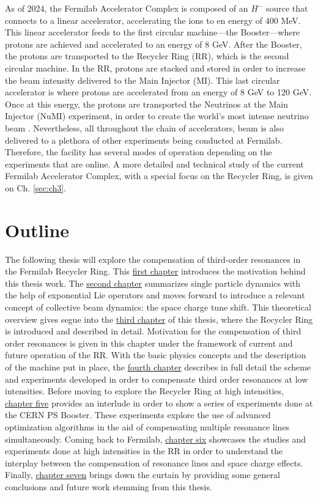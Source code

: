 As of 2024, the Fermilab Accelerator Complex is composed of an $H^-$ source that connects to a linear accelerator, accelerating the ions to en energy of 400 MeV. This linear accelerator feeds to the first circular machine---the Booster---where protons are achieved and accelerated to an energy of 8 GeV. After the Booster, the protons are transported to the Recycler Ring (RR), which is the second circular machine. In the RR, protons are stacked and stored in order to increase the beam intensity delivered to the Main Injector (MI). This last circular accelerator is where protons are accelerated from an energy of 8 GeV to 120 GeV. Once at this energy, the protons are transported the Neutrinos at the Main Injector (NuMI) experiment, in order to create the world's most intense neutrino beam \cite{numi1}. Nevertheless, all throughout the chain of accelerators, beam is also delivered to a plethora of other experiments being conducted at Fermilab. Therefore, the facility has several modes of operation depending on the experiments that are online. A more detailed and technical study of the current Fermilab Accelerator Complex, with a special focus on the Recycler Ring, is given on Ch. \ref{sec:ch3}.   

\section{Outline}

The following thesis will explore the compensation of third-order resonances in the Fermilab Recycler Ring. This \hyperref[sec:ch1]{first chapter} introduces the motivation behind this thesis work. The \hyperref[sec:ch2]{second chapter} summarizes single particle dynamics with the help of exponential Lie operators and moves forward to introduce a relevant concept of collective beam dynamics: the space charge tune shift. This theoretical overview gives segue into the \hyperref[sec:ch3]{third chapter} of this thesis, where the Recycler Ring is introduced and described in detail. Motivation for the compensation of third order resonances is given in this chapter under the framework of current and future operation of the RR. With the basic physics concepts and the description of the machine put in place, the \hyperref[sec:ch4]{fourth chapter} describes in full detail the scheme and experiments developed in order to compensate third order resonances at low intensities. Before moving to explore the Recycler Ring at high intensities, \hyperref[sec:ch5]{chapter five} provides an interlude in order to show a series of experiments done at the CERN PS Booster. These experiments explore the use of advanced optimization algorithms in the aid of compensating multiple resonance lines simultaneously. Coming back to Fermilab, \hyperref[sec:ch6]{chapter six} showcases the studies and experiments done at high intensities in the RR in order to understand the interplay between the compensation of resonance lines and space charge effects. Finally, \hyperref[sec:ch7]{chapter seven} brings down the curtain by providing some general conclusions and future work stemming from this thesis.